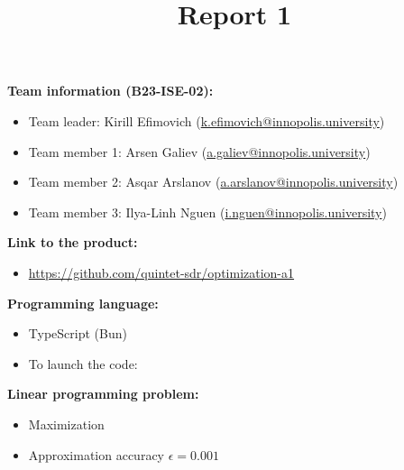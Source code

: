 \documentclass{article}
\title{\textbf{Report 1}}
\author{}
\date{}
\newcommand{\Gap}{0.25in}
\begin{document}
\maketitle

\thispagestyle{fancy}

\textbf{Team information (B23-ISE-02):}
\begin{itemize}
    \item Team leader: Kirill Efimovich (\href{mailto:k.efimovich@innopolis.university}{k.efimovich@innopolis.university})
    \item Team member 1: Arsen Galiev (\href{mailto:a.galiev@innopolis.university}{a.galiev@innopolis.university})
    \item Team member 2: Asqar Arslanov (\href{mailto:a.arslanov@innopolis.university}{a.arslanov@innopolis.university})
    \item Team member 3: Ilya-Linh Nguen (\href{mailto:i.nguen@innopolis.university}{i.nguen@innopolis.university})
\end{itemize}

\vspace{\Gap}

\textbf{Link to the product:}
\begin{itemize}
    \item \url{https://github.com/quintet-sdr/optimization-a1}
\end{itemize}

\vspace{\Gap}

\textbf{Programming language:}
\begin{itemize}
    \item TypeScript (Bun)
    \item To launch the code: 
\end{itemize}

\vspace{\Gap}

\textbf{Linear programming problem:}
\begin{itemize}
    \item Maximization
    \item Approximation accuracy \(\epsilon = 0.001\)
\end{itemize}

\vspace{\Gap}
\end{document}
